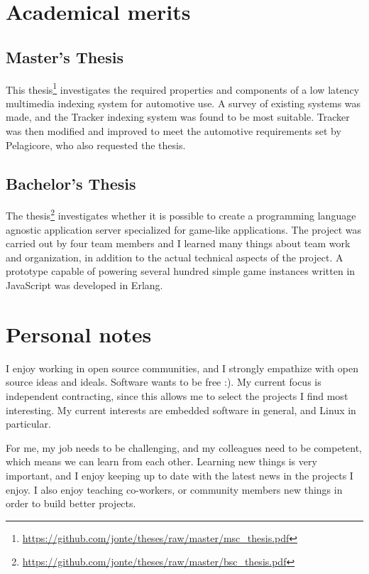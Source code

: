 \documentclass{twocolcv}
\begin{document}
\section*{Academical merits}

  \subsection*{Master's Thesis}
This thesis\footnote{\url{https://github.com/jonte/theses/raw/master/msc_thesis.pdf}} investigates the required properties and components of a low latency multimedia indexing system for automotive use. A survey of existing systems was made, and the Tracker indexing system was found to be most suitable. Tracker was then modified and improved to meet the automotive requirements set by Pelagicore, who also requested the thesis.

\subsection*{Bachelor's Thesis}
The thesis\footnote{\url{https://github.com/jonte/theses/raw/master/bsc_thesis.pdf}} investigates whether it is possible to create a programming language agnostic application server specialized for game-like applications. The project was carried out by four team members and I learned many things about team work and organization, in addition to the actual technical aspects of the project. A prototype capable of powering several hundred simple game instances written in JavaScript was developed in Erlang.

\section*{Personal notes}
I enjoy working in open source communities, and I strongly empathize with open source ideas and ideals. Software wants to be free :). My current focus is independent contracting, since this allows me to select the projects I find most interesting. My current interests are embedded software in general, and Linux in particular.

For me, my job needs to be challenging, and my colleagues need to be competent, which means we can learn from each other. Learning new things is very important, and I enjoy keeping up to date with the latest news in the projects I enjoy. I also enjoy teaching co-workers, or community members new things in order to build better projects.
\end{document}
